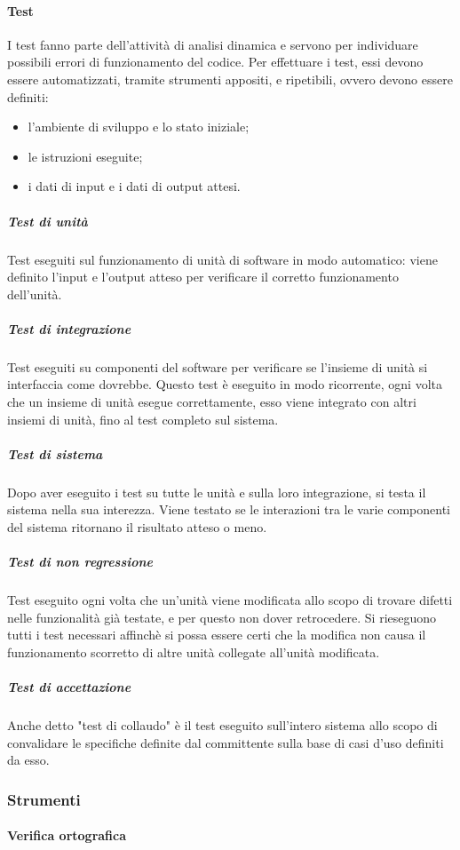         \paragraph{Test}
			I test fanno parte dell'attività di analisi dinamica e servono per individuare possibili errori di funzionamento del codice. Per effettuare i test, essi devono essere automatizzati, tramite strumenti appositi, e ripetibili, ovvero devono essere definiti:
			\begin{itemize}
				\item l'ambiente di sviluppo e lo stato iniziale;
				\item le istruzioni eseguite;
				\item i dati di input e i dati di output attesi.
			\end{itemize}
            \subparagraph*{Test di unità}
				Test eseguiti sul funzionamento di unità di software in modo automatico: viene definito l'input e l'output atteso per verificare il corretto funzionamento dell'unità.
            \subparagraph*{Test di integrazione}
				Test eseguiti su componenti del software per verificare se l'insieme di unità si interfaccia come dovrebbe. Questo test è eseguito in modo ricorrente, ogni volta che un insieme di unità esegue correttamente, esso viene integrato con altri insiemi di unità, fino al test completo sul sistema.
            \subparagraph*{Test di sistema}
				Dopo aver eseguito i test su tutte le unità e sulla loro integrazione, si testa il sistema nella sua interezza. Viene testato se le interazioni tra le varie componenti del sistema ritornano il risultato atteso o meno.
            \subparagraph*{Test di non regressione}
				Test eseguito ogni volta che un'unità viene modificata allo scopo di trovare difetti nelle funzionalità già testate, e per questo non dover retrocedere. Si rieseguono tutti i test necessari affinchè si possa essere certi che la modifica non causa il funzionamento scorretto di altre unità collegate all'unità modificata.
            \subparagraph*{Test di accettazione}   
				Anche detto "test di collaudo" è il test eseguito sull'intero sistema allo scopo di convalidare le specifiche definite dal committente sulla base di casi d'uso definiti da esso.

    \subsubsection{Strumenti}
        \paragraph{Verifica ortografica}
    